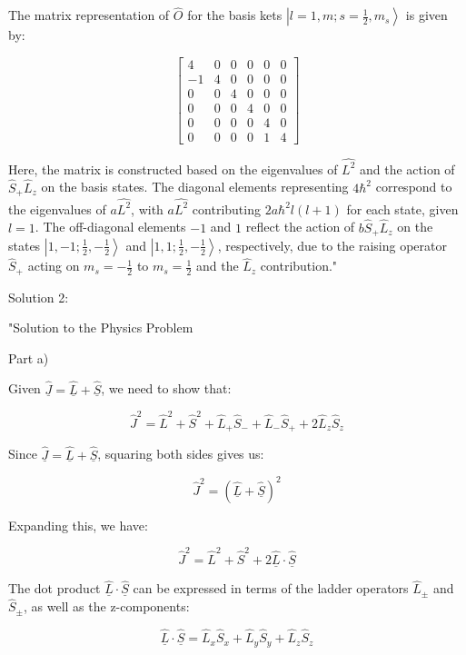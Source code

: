 The matrix representation of \( \hat{O} \) for the basis kets \( \left|l=1, m; s=\frac{1}{2}, m_{s} \right> \) is given by:

\[
\begin{bmatrix}
4 & 0 & 0 & 0 & 0 & 0 \\
-1 & 4 & 0 & 0 & 0 & 0 \\
0 & 0 & 4 & 0 & 0 & 0 \\
0 & 0 & 0 & 4 & 0 & 0 \\
0 & 0 & 0 & 0 & 4 & 0 \\
0 & 0 & 0 & 0 & 1 & 4
\end{bmatrix}
\]

Here, the matrix is constructed based on the eigenvalues of \( \hat{L^{2}} \) and the action of \( \hat{S}_{+}\hat{L}_{z} \) on the basis states. The diagonal elements representing \( 4\hbar^2 \) correspond to the eigenvalues of \( a\hat{L^{2}} \), with \( a\hat{L^{2}} \) contributing \( 2a\hbar^2 l(l+1) \) for each state, given \( l=1 \). The off-diagonal elements \( -1 \) and \( 1 \) reflect the action of \( b\hat{S}_{+}\hat{L}_{z} \) on the states \( \left|1, -1; \frac{1}{2}, -\frac{1}{2} \right> \) and \( \left|1, 1; \frac{1}{2}, -\frac{1}{2} \right> \), respectively, due to the raising operator \( \hat{S}_{+} \) acting on \( m_{s} = -\frac{1}{2} \) to \( m_{s} = \frac{1}{2} \) and the \( \hat{L}_{z} \) contribution."

Solution 2:

"Solution to the Physics Problem

Part a)

Given \( \hat{\underline{J}} = \hat{\underline{L}} + \hat{\underline{S}} \), we need to show that:

\[
\hat{J}^2 = \hat{L}^2 + \hat{S}^2 + \hat{L}_{+}\hat{S}_{-} + \hat{L}_{-}\hat{S}_{+} + 2\hat{L}_{z}\hat{S}_{z}
\]

Since \( \hat{\underline{J}} = \hat{\underline{L}} + \hat{\underline{S}} \), squaring both sides gives us:

\[
\hat{J}^2 = (\hat{\underline{L}} + \hat{\underline{S}})^2
\]

Expanding this, we have:

\[
\hat{J}^2 = \hat{L}^2 + \hat{S}^2 + 2\hat{\underline{L}}\cdot\hat{\underline{S}}
\]

The dot product \( \hat{\underline{L}}\cdot\hat{\underline{S}} \) can be expressed in terms of the ladder operators \( \hat{L}_{\pm} \) and \( \hat{S}_{\pm} \), as well as the z-components:

\[
\hat{\underline{L}}\cdot\hat{\underline{S}} = \hat{L}_{x}\hat{S}_{x} + \hat{L}_{y}\hat{S}_{y} + \hat{L}_{z}\hat{S}_{z}
\]

